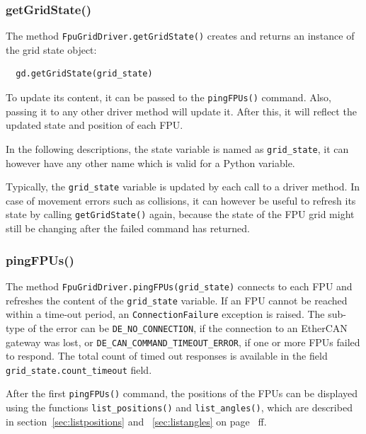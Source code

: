\documentclass[11pt,a4paper]{scrartcl}
\begin{document}
\subsubsection{getGridState()}
The method \texttt{FpuGridDriver.getGridState()} creates and returns
an instance of the grid state object:

\begin{verbatim}
  gd.getGridState(grid_state)
\end{verbatim}

To update its content, it can be passed to the \texttt{pingFPUs()}
command. Also, passing it to any other driver method will update
it. After this, it will reflect the updated state and position of each
FPU.

In the following descriptions, the state variable is named as
\texttt{grid\_state}, it can however have any other name which is
valid for a Python variable.

Typically, the \texttt{grid\_state} variable is updated by each call
to a driver method. In case of movement errors such as collisions, it
can however be useful to refresh its state by calling
\texttt{getGridState()} again, because the state of the FPU grid might
still be changing after the failed command has returned.

\subsubsection{pingFPUs()}
\begin{sloppypar}
  The method
\texttt{FpuGridDriver.pingFPUs(grid\_state)} connects to each FPU and
refreshes the content of the \texttt{grid\_state} variable. If an FPU
cannot be reached within a time-out period, an
\texttt{ConnectionFailure} exception is raised. The sub-type of the
error can be \texttt{DE\_NO\_CONNECTION}, if the connection to an
EtherCAN gateway was lost, or
\texttt{DE\_CAN\_COMMAND\_TIMEOUT\_ERROR}, if one or more FPUs failed
to respond. The total count of timed out responses is available in the
field \texttt{grid\_state.count\_timeout} field.
\end{sloppypar}

After the first \texttt{pingFPUs()} command, the positions of the FPUs
can be displayed using the functions \texttt{list\_positions()} and
\texttt{list\_angles()}, which are described in
section~\ref{sec:listpositions} and ~\ref{sec:listangles} on
page~\pageref{sec:listpositions} ff.
\end{document}
